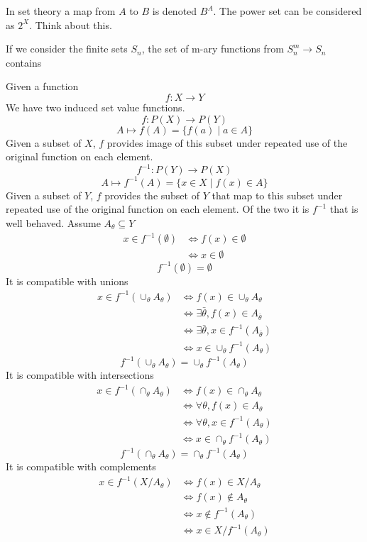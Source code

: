 \documentclass[a4paper]{scrartcl}
\begin{document}
In set theory a map from $A$ to $B$ is denoted $B^{A}$. The power set can be considered as $2^{X}$. Think about this.

If we consider the finite sets $S_{n}$, the set of m-ary functions from $S_{n}^{m} \rightarrow S_{n}$ contains

Given a function
$$f\colon X \rightarrow Y$$
We have two induced set value functions.
$$f\colon P(X) \rightarrow P(Y)$$
$$A\mapsto f(A) = \{f(a) \mid a\in A\}$$
Given a subset of $X$, $f$ provides image of this subset under repeated use of the original function on each element.
$$f^{-1}\colon P(Y) \rightarrow P(X)$$
$$A\mapsto f^{-1}(A) = \{x\in X \mid f(x)\in A\}$$
Given a subset of $Y$, $f$ provides the subset of $Y$ that map to this subset under repeated use of the original function on each element. Of the two it is $f^{-1}$ that is well behaved.
Assume $A_{\theta}\subseteq Y$
\begin{align*}
x\in f^{-1}(\emptyset)
&\iff f(x)\in\emptyset \\
&\iff x\in\emptyset 
\end{align*}
$$ f^{-1}(\emptyset) = \emptyset $$
It is compatible with unions
\begin{align*}
x\in f^{-1}(\cup_{\theta} A_{\theta})  
&\iff f(x)\in\cup_{\theta} A_{\theta} \\
&\iff \exists\bar{\theta}, f(x)\in A_{\bar{\theta}} \\
&\iff \exists\bar{\theta}, x\in f^{-1}(A_{\bar{\theta}}) \\
&\iff x\in\cup_{\theta}f^{-1}(A_{\theta})
\end{align*}
$$f^{-1}(\cup_{\theta} A_{\theta}) = \cup_{\theta}f^{-1}(A_{\theta})$$
It is compatible with intersections
\begin{align*}
x\in f^{-1}(\cap_{\theta} A_{\theta})
&\iff f(x)\in\cap_{\theta} A_{\theta} \\
&\iff \forall \theta, f(x)\in A_{\theta} \\
&\iff \forall \theta, x\in f^{-1}(A_{\theta})\\
&\iff x\in\cap_{\theta} f^{-1}(A_{\theta})
\end{align*}
$$f^{-1}(\cap_{\theta} A_{\theta}) = \cap_{\theta}f^{-1}(A_{\theta})$$
It is compatible with complements
\begin{align*}
x\in f^{-1}(X / A_{\theta})
&\iff f(x) \in X / A_{\theta} \\
&\iff f(x) \notin A_{\theta} \\
&\iff x \notin f^{-1} (A_{\theta}) \\
&\iff x\in X / f^{-1}(A_{\theta})
\end{align*}
\end{document}
